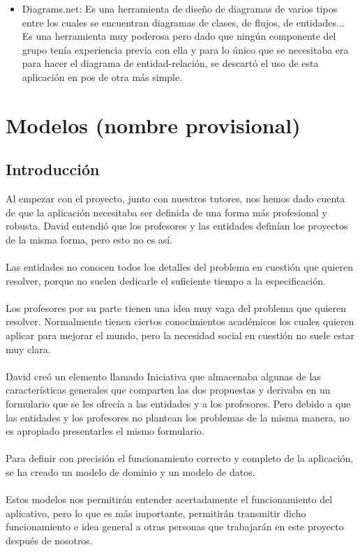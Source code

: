 \documentclass[11pt]{article}
\begin{document}
\begin{itemize}
	\item Diagrams.net: Es una herramienta de diseño de diagramas de varios tipos entre los cuales se encuentran diagramas de clases, de flujos, de entidades...
	Es una herramienta muy poderosa pero dado que ningún componente del grupo tenía experiencia previa con ella y para lo único que se necesitaba era para hacer el diagrama de entidad-relación, se descartó el uso de esta aplicación en pos de otra más simple.
\end{itemize}


\section{Modelos (nombre provisional)}
\subsection{Introducción}
Al empezar con el proyecto, junto con nuestros tutores, nos hemos dado cuenta de que la aplicación necesitaba ser definida de una forma más profesional y robusta. David entendió que los profesores y las entidades definían los proyectos de la misma forma, pero esto no es así.\\\\
Las entidades no conocen todos los detalles del problema en cuestión que quieren resolver, porque no suelen dedicarle el suficiente tiempo a la especificación.\\\\
Los profesores por su parte tienen una idea muy vaga del problema que quieren resolver. Normalmente tienen ciertos conocimientos académicos los cuales quieren aplicar para mejorar el mundo, pero la necesidad social en cuestión no suele estar muy clara.\\\\
David creó un elemento llamado Iniciativa que almacenaba algunas de las características generales que comparten las dos propuestas y derivaba en un formulario que se les ofrecía a las entidades y a los profesores. Pero debido a que las entidades y los profesores no plantean los problemas de la misma manera, no es apropiado presentarles el mismo formulario.\\\\
Para definir con precisión el funcionamiento correcto y completo de la aplicación, se ha creado un modelo de dominio y un modelo de datos.\\\\
Estos modelos nos permitirán entender acertadamente el funcionamiento del aplicativo, pero lo que es más importante, permitirán transmitir dicho funcionamiento e idea general a otras personas que trabajarán en este proyecto después de nosotros.\\\\
\end{document}
